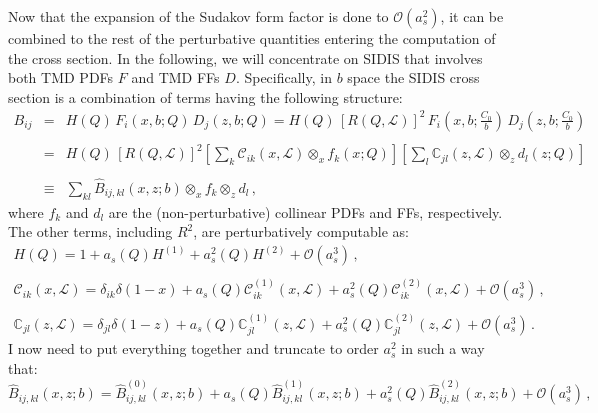 \documentclass[10pt,a4paper]{article}
\begin{document}
Now that the expansion of the Sudakov form factor is done to
$\mathcal{O}(a_s^2)$, it can be combined to the rest of the
perturbative quantities entering the computation of the cross
section. In the following, we will concentrate on SIDIS that involves
both TMD PDFs $F$ and TMD FFs $D$. Specifically, in $b$ space the
SIDIS cross section is a combination of terms having the following
structure:
\begin{equation}
\begin{array}{rcl}
  \displaystyle B_{ij} &=& \displaystyle
                           H(Q)\,F_i(x,b;Q)\,D_j(z,b;Q)
                           =H(Q)\,\left[R(Q,\mathcal{L})\right]^2
                           \,F_i\left(x,b;\frac{C_0}{b}\right)\,D_j\left(z,b;\frac{C_0}{b}\right)\\
\\
&=& \displaystyle H(Q)\,\left[R(Q,\mathcal{L})\right]^2
                           \left[\sum_{k}
    \mathcal{C}_{ik}(x,\mathcal{L}) \mathop{\otimes}_x
    f_k\left(x;Q\right)\right]\left[\sum_{l}
    \mathbb{C}_{jl}(z,\mathcal{L}) \mathop{\otimes}_z
    d_l\left(z;Q\right)\right]\\
\\
&\equiv& \displaystyle \sum_{kl}\hat{B}_{ij,kl}(x,z;b)\mathop{\otimes}_{x}f_k \mathop{\otimes}_{z}d_l \,,
\end{array}
\end{equation}
where $f_k$ and $d_l$ are the (non-perturbative) collinear PDFs and FFs,
respectively. The other terms, including $R^2$, are perturbatively
computable as:
\begin{equation}
\begin{array}{l}
\displaystyle H(Q) = 1+a_s(Q)H^{(1)}+a_s^2(Q)H^{(2)}+\mathcal{O}(a_s^3)\,,\\
\\
\displaystyle \mathcal{C}_{ik}(x,\mathcal{L}) = \delta_{ik}\delta(1-x)+a_s(Q)
  \mathcal{C}_{ik}^{(1)}(x,\mathcal{L}) +a_s^2(Q) \mathcal{C}_{ik}^{(2)}(x,\mathcal{L})
  +\mathcal{O}(a_s^3) \,,\\
\\
\displaystyle \mathbb{C}_{jl}(z,\mathcal{L}) = \delta_{jl}\delta(1-z)+a_s(Q) \mathbb{C}_{jl}^{(1)}(z,\mathcal{L}) +a_s^2(Q) \mathbb{C}_{jl}^{(2)}(z,\mathcal{L}) +\mathcal{O}(a_s^3) \,.
\end{array}
\end{equation}
I now need to put everything together and truncate to order $a_s^2$ in
such a way that:
\begin{equation}
\hat{B}_{ij,kl}(x,z;b) = \hat{B}_{ij,kl}^{(0)}(x,z;b)+a_s(Q) \hat{B}_{ij,kl}^{(1)}(x,z;b)+a_s^2(Q) \hat{B}_{ij,kl}^{(2)}(x,z;b)+\mathcal{O}(a_s^3) \,,
\end{equation}
\end{document}
